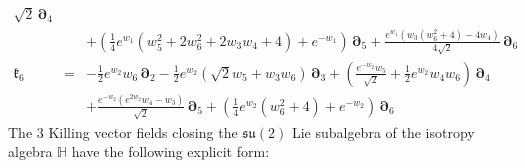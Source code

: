 \documentclass[10pt,a4paper]{article}
\newcommand{\su}{\mathfrak{su}}
\begin{document}
\begin{eqnarray}
{   \sqrt{2}}\, \boldsymbol{\partial}_4\nonumber\\
   &&+\left(\frac{1}{4} e^{w_1} \left(w_5^2+2 w_6^2+2 w_3
   w_4+4\right)+e^{-w_1}\right) \, \boldsymbol{\partial}_5+\frac{e^{w_1} \left(w_3
   \left(w_6^2+4\right)-4 w_4\right) }{4 \sqrt{2}} \, \boldsymbol{\partial}_6 \nonumber \\
   \boldsymbol{\mathfrak{k}}_6 &=& -\frac{1}{2} e^{w_2} w_6 \, \boldsymbol{\partial}_2-\frac{1}{2} e^{w_2} \left(\sqrt{2} w_5+w_3
   w_6\right) \, \boldsymbol{\partial}_3+\left(\frac{e^{-w_2} w_5}{\sqrt{2}}+\frac{1}{2} e^{w_2} w_4
   w_6\right) \, \boldsymbol{\partial}_4\nonumber\\
   &&+\frac{e^{-w_2} \left(e^{2 w_2} w_4-w_3\right)
   }{\sqrt{2}}\, \boldsymbol{\partial}_5+\left(\frac{1}{4} e^{w_2}
   \left(w_6^2+4\right)+e^{-w_2}\right) \, \boldsymbol{\partial}_6
\end{eqnarray}
The $3$ Killing vector fields closing the $\su(2)$ Lie subalgebra of the isotropy algebra $\mathbb{H}$
have the following explicit form:
\end{document}
